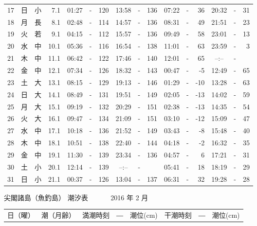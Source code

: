 \documentclass[12pt.a4j]{jsarticle}
\begin{document}
\begin{center}
\begin{table}[ht]
\begin{tabular}{|rc|cr|ccrccr|ccrccr|}
17 & 日 & 小 &  7.1 &  01:27 &-& 120  &  13:58 &-& 136  &   07:22 &-&  36  &   20:32 &-&  31  \\
18 & 月 & 長 &  8.1 &  02:48 &-& 114  &  14:57 &-& 136  &   08:31 &-&  49  &   21:51 &-&  23  \\
19 & 火 & 若 &  9.1 &  04:15 &-& 112  &  15:57 &-& 136  &   09:49 &-&  58  &   23:01 &-&  13  \\
20 & 水 & 中 & 10.1 &  05:36 &-& 116  &  16:54 &-& 138  &   11:01 &-&  63  &   23:59 &-&   3  \\
21 & 木 & 中 & 11.1 &  06:42 &-& 122  &  17:46 &-& 140  &   12:01 &-&  65  &   --:-- &-&     \\
22 & 金 & 中 & 12.1 &  07:34 &-& 126  &  18:32 &-& 143  &   00:47 &-&  -5  &   12:49 &-&  65  \\
23 & 土 & 大 & 13.1 &  08:15 &-& 129  &  19:13 &-& 146  &   01:29 &-& -10  &   13:28 &-&  63  \\
24 & 日 & 大 & 14.1 &  08:49 &-& 131  &  19:51 &-& 149  &   02:05 &-& -13  &   14:02 &-&  59  \\
25 & 月 & 大 & 15.1 &  09:19 &-& 132  &  20:29 &-& 151  &   02:38 &-& -13  &   14:35 &-&  54  \\
26 & 火 & 大 & 16.1 &  09:47 &-& 134  &  21:09 &-& 151  &   03:10 &-& -12  &   15:09 &-&  47  \\
27 & 水 & 中 & 17.1 &  10:18 &-& 136  &  21:52 &-& 149  &   03:43 &-&  -8  &   15:48 &-&  40  \\
28 & 木 & 中 & 18.1 &  10:51 &-& 138  &  22:40 &-& 144  &   04:18 &-&  -2  &   16:32 &-&  35  \\
29 & 金 & 中 & 19.1 &  11:30 &-& 139  &  23:34 &-& 136  &   04:57 &-&   6  &   17:21 &-&  31  \\
30 & 土 & 小 & 20.1 &  12:14 &-& 139  &  --:-- &-&     &   05:41 &-&  18  &   18:19 &-&  29  \\
31 & 日 & 小 & 21.1 &  00:37 &-& 126  &  13:04 &-& 137  &   06:31 &-&  32  &   19:28 &-&  28  \\
   \hline
   \end{tabular}
\end{table}
\newpage
 {\LARGE 尖閣諸島（魚釣島）  潮汐表　　　}
 {\large 2016 年  2 月}\\
 \begin{table}[ht]
    \begin{tabular}{|rc|cr|ccrccr|ccrccr|}
    \hline
    \multicolumn{2}{|c|}{日（曜）} & \multicolumn{2}{c|}{潮（月齢）} & \multicolumn{6}{c|}{満潮時刻　―　潮位(cm)} & \multicolumn{6}{c|}{干潮時刻　―　潮位(cm)} \\

\end{tabular}
\end{table}
\end{center}
\end{document}
